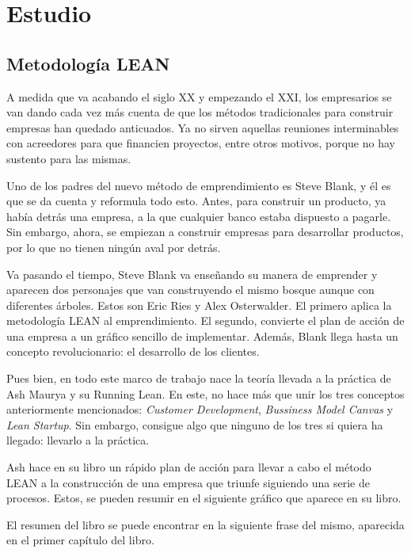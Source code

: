 
\chapter{Estudio}\label{estudio}
\section{Metodología LEAN}\label{sec:metodologia_lean}

A medida que va acabando el siglo XX y empezando el XXI, los empresarios se van dando cada vez más cuenta de que los métodos tradicionales para construir empresas han quedado anticuados. Ya no sirven aquellas reuniones interminables con acreedores para que financien proyectos, entre otros motivos, porque no hay sustento para las mismas.

Uno de los padres del nuevo método de emprendimiento es Steve Blank, y él es que se da cuenta y reformula todo esto. Antes, para construir un producto, ya había detrás una empresa, a la que cualquier banco estaba dispuesto a pagarle. Sin embargo, ahora, se empiezan a construir empresas para desarrollar productos, por lo que no tienen ningún aval por detrás.

Va pasando el tiempo, Steve Blank va enseñando su manera de emprender y aparecen dos personajes que van construyendo el mismo bosque aunque con diferentes árboles. Estos son Eric Ries y Alex Osterwalder. El primero aplica la metodología LEAN al emprendimiento. El segundo, convierte el plan de acción de una empresa a un gráfico sencillo de implementar. Además, Blank llega hasta un concepto revolucionario: el desarrollo de los clientes.

Pues bien, en todo este marco de trabajo nace la teoría llevada a la práctica de Ash Maurya y su Running Lean. En este, no hace más que unir los tres conceptos anteriormente mencionados: \textit{Customer Development}, \textit{Bussiness Model Canvas} y \textit{Lean Startup}. Sin embargo, consigue algo que ninguno de los tres si quiera ha llegado: llevarlo a la práctica.

Ash hace en su libro un rápido plan de acción para llevar a cabo el método LEAN a la construcción de una empresa que triunfe siguiendo una serie de procesos. Estos, se pueden resumir en el siguiente gráfico que aparece en su libro.


El resumen del libro se puede encontrar en la siguiente frase del mismo, aparecida en el primer capítulo del libro.

